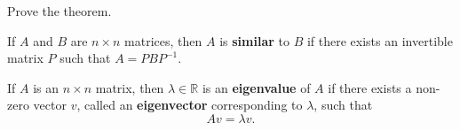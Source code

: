 \begin{enumerate}
\Problem Prove the theorem.

\vfill

\begin{defn}
If $A$ and $B$ are $n\times n$ matrices, then $A$ is {\bf similar} to $B$ if there exists an invertible matrix $P$ such that $A=PB P^{-1}$.
\end{defn}

\begin{defn}
If $A$ is an $n \times n$ matrix, then $\lambda \in \mathbb{R}$ is an {\bf eigenvalue} of $A$ if there exists a non-zero vector $v$, called an {\bf eigenvector} corresponding to $\lambda$, such that $$Av=\lambda v.$$
\end{defn}

\newpage

%
%
%

\end{enumerate}
